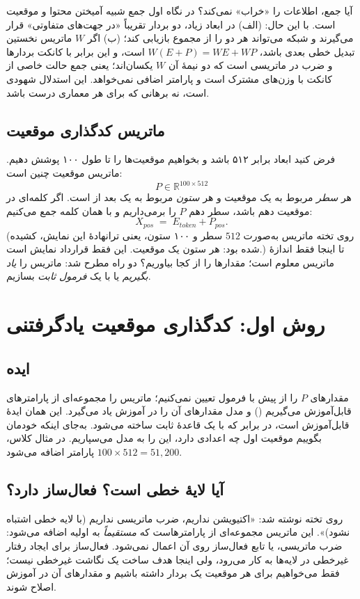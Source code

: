 \begin{addedbox}{آیا جمع، اطلاعات را «خراب» نمی‌کند؟}
در نگاه اول جمع شبیه آمیختن محتوا و موقعیت است. با این حال: (الف) در ابعاد زیاد، دو بردار تقریباً «در جهت‌های متفاوتی» قرار می‌گیرند و شبکه می‌تواند هر دو را از مجموع بازیابی کند؛ (ب) اگر $W$ ماتریس نخستین تبدیل خطی بعدی باشد، $W(E+P)=WE+WP$ است، و این برابر با کانکت بردارها و ضرب در ماتریسی است که دو نیمهٔ آن $W$ ‏یکسان‌اند؛ یعنی جمع حالت خاصی از کانکت با وزن‌های مشترک است و پارامتر اضافی نمی‌خواهد. این استدلال شهودی است، نه برهانی که برای هر معماری درست باشد.
\end{addedbox}

\subsection{ماتریس کدگذاری موقعیت}
فرض کنید ابعاد  برابر ۵۱۲ باشد و بخواهیم موقعیت‌ها را تا طول ۱۰۰ پوشش دهیم. ماتریس موقعیت چنین است:
\[
\boxed{P\in\mathbb{R}^{100\times 512}}
\]
هر \emph{سطر} مربوط به یک موقعیت و هر \emph{ستون} مربوط به یک بعد از  است. اگر کلمه‌ای در موقعیت دهم باشد، سطر دهم $P$ را برمی‌داریم و با  همان کلمه جمع می‌کنیم:
\[
X_{pos} \;=\; E_{token} + P_{pos}.
\]
(روی تخته ماتریس به‌صورت $512$ سطر و ۱۰۰ ستون، یعنی ترانهادهٔ این نمایش، کشیده شده بود: هر ستون یک موقعیت. این فقط قرارداد نمایش است.) تا اینجا فقط اندازهٔ ماتریس معلوم است؛ مقدارها را از کجا بیاوریم؟ دو راه مطرح شد: ماتریس را \emph{یاد بگیریم} یا با یک \emph{فرمول ثابت} بسازیم.

\section{روش اول: کدگذاری موقعیت یادگرفتنی}

\subsection{ایده}
مقدارهای $P$ را از پیش با فرمول تعیین نمی‌کنیم؛ ماتریس را مجموعه‌ای از پارامترهای قابل‌آموزش می‌گیریم () و مدل مقدارهای آن را در آموزش یاد می‌گیرد. این همان ایدهٔ  قابل‌آموزش است، در برابر  که با یک قاعدهٔ ثابت ساخته می‌شود. به‌جای اینکه خودمان بگوییم موقعیت اول چه اعدادی دارد، این را به مدل می‌سپاریم. در مثال کلاس، $100\times 512=51{,}200$ پارامتر اضافه می‌شود.

\subsection{آیا لایهٔ خطی است؟ فعال‌ساز دارد؟}
روی تخته نوشته شد: «اکتیویشن نداریم، ضرب ماتریسی نداریم (با لایه خطی اشتباه نشود)». این ماتریس مجموعه‌ای از پارامترهاست که \emph{مستقیماً} به  اولیه اضافه می‌شود: ضرب ماتریسی،  یا تابع فعال‌ساز روی آن اعمال نمی‌شود. فعال‌ساز برای ایجاد رفتار غیرخطی در لایه‌ها به کار می‌رود، ولی اینجا هدف ساخت یک نگاشت غیرخطی نیست؛ فقط می‌خواهیم برای هر موقعیت یک بردار داشته باشیم و مقدارهای آن در آموزش اصلاح شوند.

